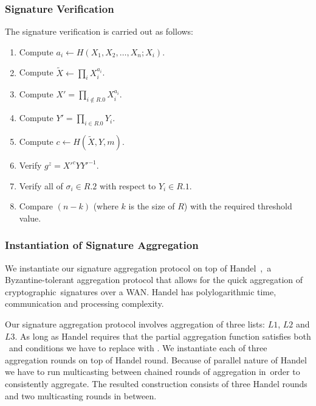 \subsubsection{Signature Verification}
The signature verification is carried out as follows:
\begin{enumerate}
    \item Compute ${a_i\leftarrow H(X_1,X_2,\dots,X_n;X_i)}$.
    \item Compute ${\tilde{X}\leftarrow\prod_i X_i^{a_i}}$.
    \item Compute ${X' = \prod_{i\notin R.0}X_i^{a_i}}$.
    \item Compute ${Y' = \prod_{i\in R.0} Y_i}$.
    \item Compute ${c\leftarrow H(\tilde{X}, Y, m)}$.
    \item Verify ${g^z=X'^cYY'^{-1}}$.
    \item Verify all of ${\sigma_i\in R.2}$ with respect to ${Y_i\in R.1}$.
    \item Compare ${(n-k)}$ (where $k$ is the size of $R$) with the required threshold value.
\end{enumerate}

\subsubsection{Instantiation of Signature Aggregation}\label{subsubsec:instantiation-of-signature-aggregation}

We instantiate our signature aggregation protocol on top of Handel~\cite{bégassat2019handel},\
a Byzantine-tolerant aggregation protocol that allows for the quick aggregation of cryptographic\
signatures over a WAN\@.
Handel has polylogarithmic time, communication and processing complexity.

Our signature aggregation protocol involves aggregation of three lists: $L1$, $L2$ and $L3$.
As long as Handel requires that the partial aggregation function satisfies both \
and  conditions we have to replace  with .
We instantiate each of three aggregation rounds on top of Handel round.
Because of parallel nature of Handel we have to run multicasting between chained rounds of aggregation in\
order to consistently aggregate.
The resulted construction consists of three Handel rounds and two multicasting rounds in between.

